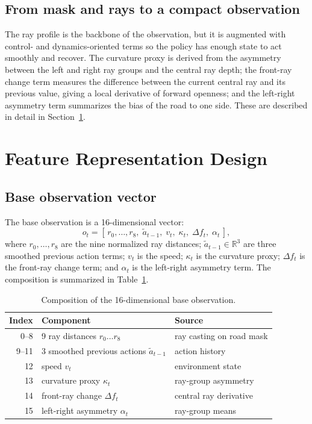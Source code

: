 \documentclass[conference]{IEEEtran}
\begin{document}
\subsection{From mask and rays to a compact observation}

The ray profile is the backbone of the observation, but it is augmented with
control- and dynamics-oriented terms so the policy has enough state to act
smoothly and recover. The curvature proxy is derived from the asymmetry between
the left and right ray groups and the central ray depth; the front-ray change
term measures the difference between the current central ray and its previous
value, giving a local derivative of forward openness; and the left-right
asymmetry term summarizes the bias of the road to one side. These are described
in detail in Section~\ref{sec:features}.

\section{Feature Representation Design}
\label{sec:features}

\subsection{Base observation vector}

The base observation is a 16-dimensional vector:
\begin{equation}
o_t = [\,r_0,\dots,r_8,\; \tilde a_{t-1},\; v_t,\; \kappa_t,\; \Delta f_t,\; \alpha_t\,],
\label{eq:obs}
\end{equation}
where $r_0,\dots,r_8$ are the nine normalized ray distances;
$\tilde a_{t-1}\in\mathbb{R}^3$ are three smoothed previous action terms;
$v_t$ is the speed; $\kappa_t$ is the curvature proxy; $\Delta f_t$ is the
front-ray change term; and $\alpha_t$ is the left-right asymmetry term. The
composition is summarized in Table~\ref{tab:obs}.

\begin{table}[t]
\caption{Composition of the 16-dimensional base observation.}
\label{tab:obs}
\centering
\small
\begin{tabular}{rll}
\toprule
Index & Component & Source \\
\midrule
0--8   & 9 ray distances $r_0\dots r_8$ & ray casting on road mask \\
9--11  & 3 smoothed previous actions $\tilde a_{t-1}$ & action history \\
12     & speed $v_t$ & environment state \\
13     & curvature proxy $\kappa_t$ & ray-group asymmetry \\
14     & front-ray change $\Delta f_t$ & central ray derivative \\
15     & left-right asymmetry $\alpha_t$ & ray-group means \\
\bottomrule
\end{tabular}
\end{table}
\end{document}
